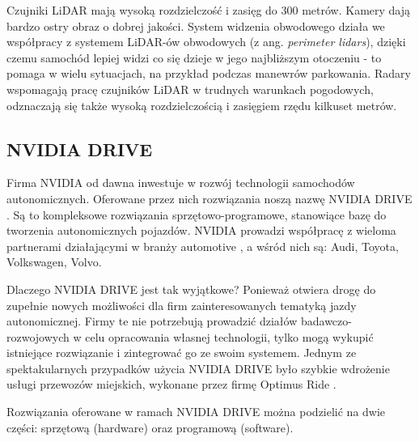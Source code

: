 Czujniki LiDAR mają wysoką rozdzielczość i zasięg do 300 metrów. Kamery dają bardzo ostry obraz o dobrej jakości. System widzenia obwodowego działa we współpracy z systemem LiDAR-ów obwodowych (z ang. \textit{perimeter lidars}), dzięki czemu samochód lepiej widzi co się dzieje w jego najbliższym otoczeniu - to pomaga w wielu sytuacjach, na przykład podczas manewrów parkowania. Radary wspomagają pracę czujników LiDAR w trudnych warunkach pogodowych, odznaczają się także wysoką rozdzielczością i zasięgiem rzędu kilkuset metrów.

\subsection{NVIDIA DRIVE}
Firma NVIDIA od dawna inwestuje w rozwój technologii samochodów autonomicznych. Oferowane przez nich rozwiązania noszą nazwę NVIDIA DRIVE \cite{nvidiaDrive:overview}. Są to kompleksowe rozwiązania sprzętowo-programowe, stanowiące bazę do tworzenia autonomicznych pojazdów. NVIDIA prowadzi współpracę z wieloma partnerami działającymi w branży automotive \cite{nvidiaDrive:partners}, a wśród nich są: Audi, Toyota, Volkswagen, Volvo.

Dlaczego NVIDIA DRIVE jest tak wyjątkowe? Ponieważ otwiera drogę do zupełnie nowych możliwości dla firm zainteresowanych tematyką jazdy autonomicznej. Firmy te nie potrzebują prowadzić działów badawczo-rozwojowych w celu opracowania własnej technologii, tylko mogą wykupić istniejące rozwiązanie i zintegrować go ze swoim systemem. Jednym ze spektakularnych przypadków użycia NVIDIA DRIVE było szybkie wdrożenie usługi przewozów miejskich, wykonane przez firmę Optimus Ride \cite{nvidiaDrive:optimusRide}.

Rozwiązania oferowane w ramach NVIDIA DRIVE można podzielić na dwie części: sprzętową (hardware) oraz programową (software).

